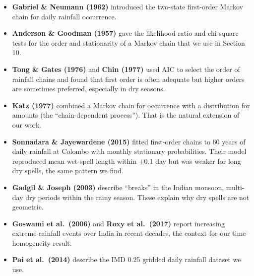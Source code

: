 \documentclass[11pt,a4paper]{article}
\providecommand{\tightlist}{\setlength{\itemsep}{0pt}\setlength{\parskip}{0pt}}
\begin{document}
\begin{itemize}

\tightlist

\item

  \textbf{Gabriel \& Neumann (1962)} introduced the two-state first-order Markov chain for daily rainfall occurrence.

\item

  \textbf{Anderson \& Goodman (1957)} gave the likelihood-ratio and chi-square tests for the order and stationarity of a Markov chain that we use in Section 10.

\item

  \textbf{Tong \& Gates (1976)} and \textbf{Chin (1977)} used AIC to select the order of rainfall chains and found that first order is often adequate but higher orders are sometimes preferred, especially in dry seasons.

\item

  \textbf{Katz (1977)} combined a Markov chain for occurrence with a distribution for amounts (the ``chain-dependent process''). That is the natural extension of our work.

\item

  \textbf{Sonnadara \& Jayewardene (2015)} fitted first-order chains to 60 years of daily rainfall at Colombo with monthly stationary probabilities. Their model reproduced mean wet-spell length within $\pm$0.1 day but was weaker for long dry spells, the same pattern we find.

\item

  \textbf{Gadgil \& Joseph (2003)} describe ``breaks'' in the Indian monsoon, multi-day dry periods within the rainy season. These explain why dry spells are not geometric.

\item

  \textbf{Goswami et al.~(2006)} and \textbf{Roxy et al.~(2017)} report increasing extreme-rainfall events over India in recent decades, the context for our time-homogeneity result.

\item

  \textbf{Pai et al.~(2014)} describe the IMD 0.25\textdegree{} gridded daily rainfall dataset we use.

\end{itemize}
\end{document}
